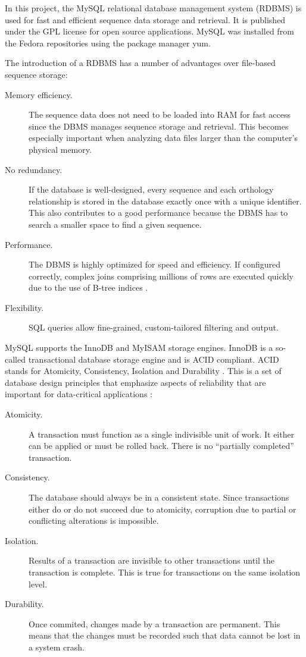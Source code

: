 In this project, the MySQL relational database management system (RDBMS) is used
for fast and efficient sequence data storage and retrieval. It is published
under the GPL license for open source applications. MySQL was installed from the
Fedora repositories using the package manager yum.

The introduction of a RDBMS has a number of advantages over file-based sequence
storage:

\begin{description}
	\item[Memory efficiency.] The sequence data does not need to be loaded into
		RAM for fast access since the DBMS manages sequence storage and retrieval.
		This becomes especially important when analyzing data files larger than the
		computer's physical memory.
	\item[No redundancy.] If the database is well-designed, every sequence and
		each orthology relationship is stored in the database exactly once with a
		unique identifier. This also contributes to a good performance because the
		DBMS has to search a smaller space to find a given sequence.
	\item[Performance.] The DBMS is highly optimized for speed and efficiency. If
		configured correctly, complex joins comprising millions of rows are executed
		quickly due to the use of B-tree indices \citep{comer1979}.
	\item[Flexibility.] SQL queries allow fine-grained, custom-tailored filtering
		and output.
\end{description}

MySQL supports the InnoDB and MyISAM storage engines. InnoDB is a so-called
transactional database storage engine and is ACID compliant. ACID stands for
Atomicity, Consistency, Isolation and Durability \citep{haerder1983}.  This is a
set of database design principles that emphasize aspects of reliability that are
important for data-critical applications \citep{schwartz2012}:

\begin{description}
	\item[Atomicity.] A transaction must function as a single indivisible unit of
		work. It either can be applied or must be rolled back. There is no
		``partially completed'' transaction.
	\item[Consistency.] The database should always be in a consistent state. Since
		transactions either do or do not succeed due to atomicity, corruption due to
		partial or conflicting alterations is impossible.
	\item[Isolation.] Results of a transaction are invisible to other
		transactions until the transaction is complete. This is true for
		transactions on the same isolation level.
	\item[Durability.] Once commited, changes made by a transaction are permanent.
		This means that the changes must be recorded such that data cannot be lost
		in a system crash. 
\end{description}

